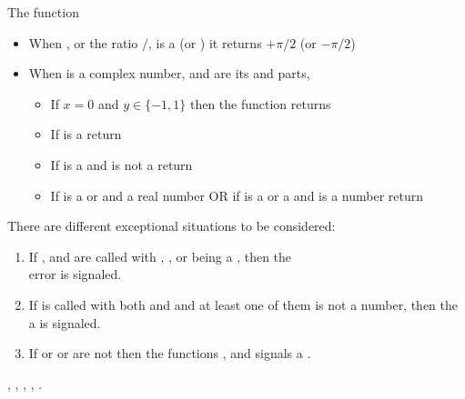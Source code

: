 \documentclass[../Exponentials-Logarithms-Trigonometry.tex]{subfiles}
\begin{document}
\noindent
The function 
\begin{itemize}
\item When , or the ratio $/$, is a
   (or ) it returns $+\pi/2$
  (or $-\pi/2$)
  
\item When  is a complex
  number,  and  are its  and
   parts,
  \begin{itemize}
  \item If $x = 0$ and $y \in \{-1, 1\}$ then the function
    \code{)} returns
     
    
  \item If  is a  return
    \code{))))}
    
  \item If  is a  and  is not a
     return
    
  \item If  is a  or
     and  a real number OR if  is
    a  or a  and  is
    a   number return
  \end{itemize}
\end{itemize}


\DExceptional{}

There are different exceptional situations to be considered:
\begin{enumerate}
\item If ,  and  are called with
  , , or  being a
  , then the\\
   error is signaled.

\item If  is called with both  and
   and at least one of them is not a  number,
  then the a  is signaled.

\item If  or  or  are not \CL{}
   then the functions ,  and
   signals a .
\end{enumerate}

\DSeeAlso{}

\code{*}, \code{-}, , , .
\end{document}
